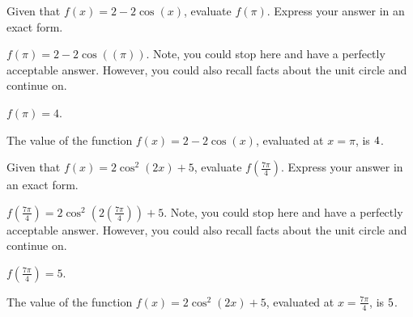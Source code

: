 \begin{shuffle}
\begin{exercise}
Given that $f(x)=2-2 \cos (x)$, evaluate $f(\pi)$. Express your answer in an exact form.
\begin{solution}
\begin{hint}
$f(\pi)=2-2 \cos ((\pi))$. Note, you could stop here and have a perfectly acceptable answer. However, you could also recall facts about the unit circle and continue on. 
\end{hint}
\begin{hint}
$f(\pi)=4$.
\end{hint}
The value of the function $f(x) = 2-2 \cos (x)$, evaluated at $x=\pi$, is ${4}$.
\end{solution}
\end{exercise}

\begin{exercise}
Given that $f(x)=2 \cos ^2(2 x)+5$, evaluate $f(\frac{7 \pi }{4})$. Express your answer in an exact form.
\begin{solution}
\begin{hint}
$f(\frac{7 \pi }{4})=2 \cos ^2(2 (\frac{7 \pi }{4}))+5$. Note, you could stop here and have a perfectly acceptable answer. However, you could also recall facts about the unit circle and continue on. 
\end{hint}
\begin{hint}
$f(\frac{7 \pi }{4})=5$.
\end{hint}
The value of the function $f(x) = 2 \cos ^2(2 x)+5$, evaluated at $x=\frac{7 \pi }{4}$, is ${5}$.
\end{solution}
\end{exercise}
\end{shuffle}
